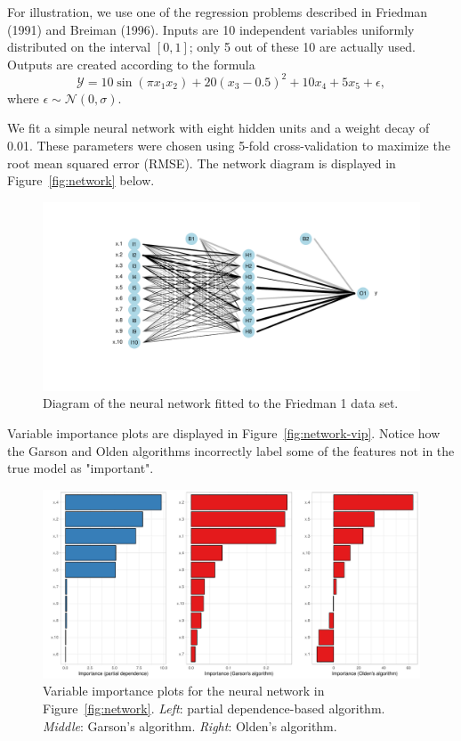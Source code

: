 \documentclass{article}
\begin{document}
For illustration, we use one of the regression problems described in Friedman (1991) and Breiman (1996). Inputs are 10 independent variables uniformly distributed on the interval $\left[0, 1\right]$; only 5 out of these 10 are actually used. Outputs are created according to the formula
\begin{equation}
\mathcal{Y} = 10 \sin\left(\pi x_1 x_2\right) + 20 \left(x_3 - 0.5\right) ^ 2 + 10 x_4 + 5 x_5 + \epsilon,
\end{equation}
where $\epsilon \sim \mathcal{N}\left(0, \sigma\right)$.


We fit a simple neural network with eight hidden units and a weight decay of 0.01. These parameters were chosen using 5-fold cross-validation to maximize the root mean squared error (RMSE). The network diagram is displayed in Figure~\ref{fig:network} below.
\begin{figure}[!htb]
  \label{network}
  \centering
  \includegraphics[width=1.0\textwidth]{network}
  \caption{Diagram of the neural network fitted to the Friedman 1 data set.}
\end{figure}

Variable importance plots are displayed in Figure~\ref{fig:network-vip}. Notice how the Garson and Olden algorithms incorrectly label some of the features not in the true model as "important".
\begin{figure}[!htb]
  \label{network-vip}
  \centering
  \includegraphics[width=1.0\textwidth]{network-vip}
  \caption{Variable importance plots for the neural network in Figure~\ref{fig:network}. \textit{Left}: partial dependence-based algorithm. \textit{Middle}: Garson's algorithm. \textit{Right}: Olden's algorithm.}
\end{figure}
\end{document}
